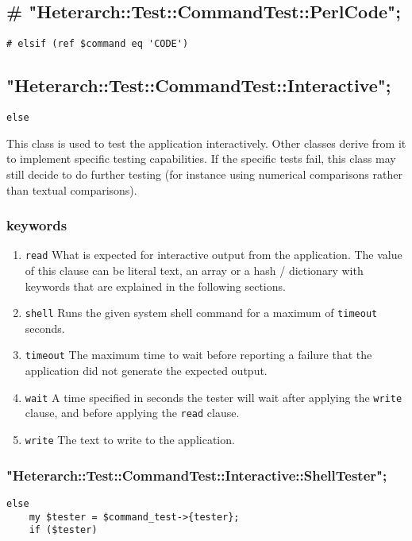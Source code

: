 \documentclass[11pt]{article}
\begin{document}
\subsection{\# "Heterarch::Test::CommandTest::PerlCode";}
\label{sec-4-3}
\begin{verbatim}
# elsif (ref $command eq 'CODE')
\end{verbatim}

\subsection{"Heterarch::Test::CommandTest::Interactive";}
\label{sec-4-4}
\begin{verbatim}
else
\end{verbatim}
This class is used to test the application interactively.  Other
classes derive from it to implement specific testing capabilities.  If
the specific tests fail, this class may still decide to do further
testing (for instance using numerical comparisons rather than textual
comparisons).


\subsubsection{keywords}
\label{sec-4-4-1}
\begin{enumerate}
\item \texttt{read}
\label{sec-4-4-1-1}
What is expected for interactive output from the application.  The
value of this clause can be literal text, an array or a hash /
dictionary with keywords that are explained in the following sections.

\item \texttt{shell}
\label{sec-4-4-1-2}
Runs the given system shell command for a maximum of \verb~timeout~
seconds.

\item \texttt{timeout}
\label{sec-4-4-1-3}
The maximum time to wait before reporting a failure that the
application did not generate the expected output.

\item \texttt{wait}
\label{sec-4-4-1-4}
A time specified in seconds the tester will wait after applying the
\verb~write~ clause, and before applying the \verb~read~ clause.
\item \texttt{write}
\label{sec-4-4-1-5}
The text to write to the application.
\end{enumerate}

\subsubsection{"Heterarch::Test::CommandTest::Interactive::ShellTester";}
\label{sec-4-4-2}
\begin{verbatim}
else
    my $tester = $command_test->{tester};
    if ($tester)
\end{verbatim}
\end{document}
